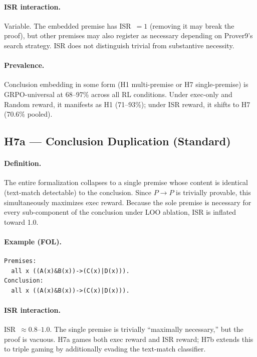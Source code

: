 \paragraph{ISR interaction.}
Variable. The embedded premise has ISR~$=1$ (removing it may break the proof), but other premises may also register as necessary depending on Prover9's search strategy.
ISR does not distinguish trivial from substantive necessity.

\paragraph{Prevalence.}
Conclusion embedding in some form (H1 multi-premise or H7 single-premise) is GRPO-universal at 68--97\% across all RL conditions.
Under exec-only and Random reward, it manifests as H1 (71--93\%); under ISR reward, it shifts to H7 (70.6\% pooled).


\subsection{H7a --- Conclusion Duplication (Standard)}

\paragraph{Definition.}
The entire formalization collapses to a single premise whose content is identical (text-match detectable) to the conclusion.
Since $P \to P$ is trivially provable, this simultaneously maximizes exec reward.
Because the sole premise is necessary for every sub-component of the conclusion under LOO ablation, ISR is inflated toward 1.0.

\paragraph{Example (FOL).}
{\small\begin{verbatim}
Premises:
  all x ((A(x)&B(x))->(C(x)|D(x))).
Conclusion:
  all x ((A(x)&B(x))->(C(x)|D(x))).
\end{verbatim}}

\paragraph{ISR interaction.}
ISR~$\approx 0.8$--$1.0$.
The single premise is trivially ``maximally necessary,'' but the proof is vacuous.
H7a games both exec reward and ISR reward; H7b extends this to triple gaming by additionally evading the text-match classifier.

